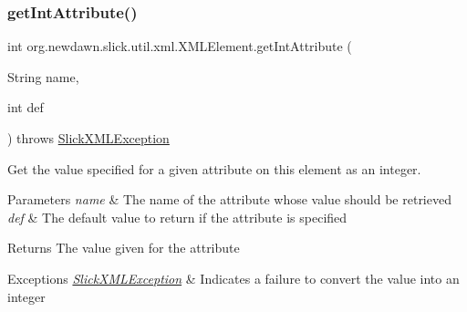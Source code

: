 \subsubsection{\texorpdfstring{get\+Int\+Attribute()}{getIntAttribute()}\hspace{0.1cm}{\footnotesize\ttfamily [2/2]}}
{\footnotesize\ttfamily int org.\+newdawn.\+slick.\+util.\+xml.\+X\+M\+L\+Element.\+get\+Int\+Attribute (\begin{DoxyParamCaption}\item[{String}]{name,  }\item[{int}]{def }\end{DoxyParamCaption}) throws \mbox{\hyperlink{classorg_1_1newdawn_1_1slick_1_1util_1_1xml_1_1_slick_x_m_l_exception}{Slick\+X\+M\+L\+Exception}}\hspace{0.3cm}{\ttfamily [inline]}}

Get the value specified for a given attribute on this element as an integer.


\begin{DoxyParams}{Parameters}
{\em name} & The name of the attribute whose value should be retrieved \\
\hline
{\em def} & The default value to return if the attribute is specified \\
\hline
\end{DoxyParams}
\begin{DoxyReturn}{Returns}
The value given for the attribute 
\end{DoxyReturn}

\begin{DoxyExceptions}{Exceptions}
{\em \mbox{\hyperlink{classorg_1_1newdawn_1_1slick_1_1util_1_1xml_1_1_slick_x_m_l_exception}{Slick\+X\+M\+L\+Exception}}} & Indicates a failure to convert the value into an integer \\
\hline
\end{DoxyExceptions}


